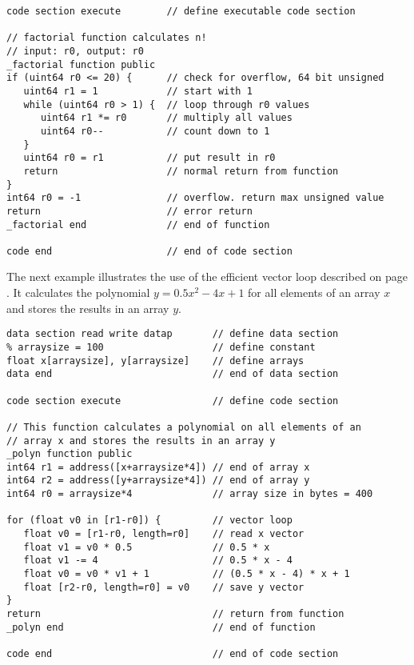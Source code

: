 \documentclass[forwardcom.tex]{subfiles}
\begin{document}
\begin{example}
\label{exampleFactorial}
\end{example} %
\begin{lstlisting}[frame=single]
code section execute        // define executable code section

// factorial function calculates n!
// input: r0, output: r0
_factorial function public
if (uint64 r0 <= 20) {      // check for overflow, 64 bit unsigned
   uint64 r1 = 1            // start with 1
   while (uint64 r0 > 1) {  // loop through r0 values
      uint64 r1 *= r0       // multiply all values
      uint64 r0--           // count down to 1
   }
   uint64 r0 = r1           // put result in r0
   return                   // normal return from function
}
int64 r0 = -1               // overflow. return max unsigned value
return                      // error return
_factorial end              // end of function

code end                    // end of code section
\end{lstlisting}
\vspace{4mm}

The next example illustrates the use of the efficient vector loop described on page \pageref{vectorLoops}. 
It calculates the polynomial $y = 0.5 x^2 - 4 x + 1$ for all elements of an array $x$
and stores the results in an array $y$.

\begin{example}
\label{examplePolyn}
\end{example} %
\begin{lstlisting}[frame=single]
data section read write datap       // define data section
% arraysize = 100                   // define constant
float x[arraysize], y[arraysize]    // define arrays
data end                            // end of data section

code section execute                // define code section

// This function calculates a polynomial on all elements of an
// array x and stores the results in an array y
_polyn function public
int64 r1 = address([x+arraysize*4]) // end of array x
int64 r2 = address([y+arraysize*4]) // end of array y
int64 r0 = arraysize*4              // array size in bytes = 400

for (float v0 in [r1-r0]) {         // vector loop
   float v0 = [r1-r0, length=r0]    // read x vector
   float v1 = v0 * 0.5              // 0.5 * x
   float v1 -= 4                    // 0.5 * x - 4
   float v0 = v0 * v1 + 1           // (0.5 * x - 4) * x + 1
   float [r2-r0, length=r0] = v0    // save y vector
}
return                              // return from function
_polyn end                          // end of function

code end                            // end of code section
\end{lstlisting}
\vv
\end{document}
